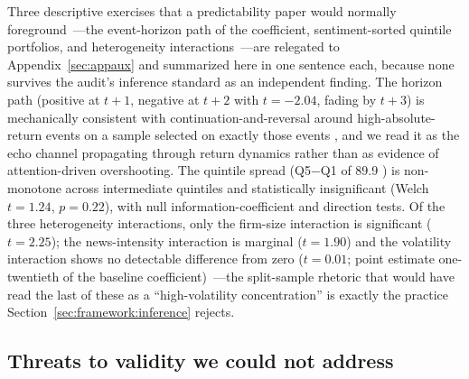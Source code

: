 Three descriptive exercises that a predictability paper would normally foreground~---the event-horizon path of the coefficient, sentiment-sorted quintile portfolios, and heterogeneity interactions~---are relegated to Appendix~\ref{sec:appaux} and summarized here in one sentence each, because none survives the audit's inference standard as an independent finding. The horizon path (positive at $t+1$, negative at $t+2$ with $t=-2.04$, fading by $t+3$) is mechanically consistent with continuation-and-reversal around high-absolute-return events on a sample selected on exactly those events \citep{chan2003}, and we read it as the echo channel propagating through return dynamics rather than as evidence of attention-driven overshooting. The quintile spread (Q5$-$Q1 of 89.9 \bps{}) is non-monotone across intermediate quintiles and statistically insignificant (Welch $t=1.24$, $p=0.22$), with null information-coefficient and direction tests. Of the three heterogeneity interactions, only the firm-size interaction is significant ($t=2.25$); the news-intensity interaction is marginal ($t=1.90$) and the volatility interaction shows no detectable difference from zero ($t=0.01$; point estimate one-twentieth of the baseline coefficient)~---the split-sample rhetoric that would have read the last of these as a ``high-volatility concentration'' is exactly the practice Section~\ref{sec:framework:inference} rejects.

\subsection{Threats to validity we could not address}
\label{sec:robust:threats}

